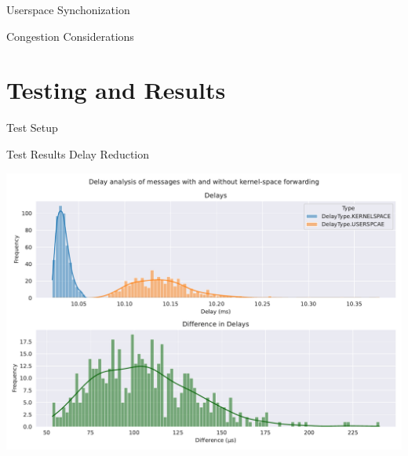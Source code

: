 \documentclass[shortpres,aspectratio=43]{beamer}
\begin{document}
\begin{frame}{Userspace Synchonization}
\end{frame}

\begin{frame}{Congestion Considerations}
\end{frame}


\section{Testing and Results}

\begin{frame}{}
  \tableofcontents[currentsection]
\end{frame}

\begin{frame}{Test Setup}
\end{frame}

\begin{frame}{Test Results Delay Reduction}
    \begin{minipage}{\textwidth}
        \centering
        \includegraphics[scale=0.4]{../figures/04_testing_and_results/delays_small_packets_simple_userspace.pdf}
    \end{minipage}\hfill
\end{frame}
\end{document}
